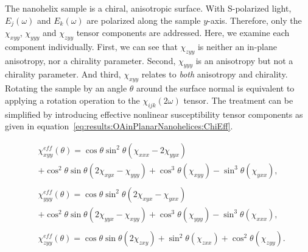 The nanohelix sample is a chiral, anisotropic surface. With S-polarized light, ${E_j}(\omega)$ and ${E_k}(\omega)$ are polarized along the sample $y$-axis. Therefore, only the $\chi_{xyy}$, $\chi_{yyy}$ and $\chi_{zyy}$ tensor components are addressed. Here, we examine each component individually. 
First, we can see that $\chi_{zyy}$ is neither an in-plane anisotropy, nor a chirality parameter. Second, $\chi_{yyy}$ is an anisotropy but not a chirality parameter. And third, $\chi_{xyy}$ relates to \textit{both} anisotropy and chirality. 
Rotating the sample by an angle $\theta$ around the surface normal is equivalent to applying a rotation operation to the $\chi_{ijk}(2\omega)$ tensor. The treatment can be simplified by introducing effective nonlinear susceptibility tensor components as given in equation~\ref{eq:results:OAinPlanarNanohelices:ChiEff}.

\begin{equation}\label{eq:results:OAinPlanarNanohelices:ChiEff}
	\begin{split}
		&\chi_{xyy}^{eff}(\theta) = \cos\theta\sin^2\theta(\chi_{xxx} - 2\chi_{yyx}) \\
		&+ {\cos^2}\theta\sin\theta (2\chi _{xyx} - \chi_{yyy}) + {\cos^3}\theta(\chi_{xyy}) - {\sin^3}\theta(\chi _{yxx}), \\
		\\
		&\chi_{yyy}^{eff}(\theta) = \cos\theta\sin^2\theta(2\chi_{xyx} - \chi_{yxx}) \\
		&+ {\cos^2}\theta\sin\theta (2\chi _{yyx} - \chi_{xyy}) + {\cos^3}\theta(\chi_{yyy}) - {\sin^3}\theta(\chi _{xxx}), \\
		\\
		&\chi _{zyy}^{eff}(\theta) = \cos\theta\sin\theta (2\chi_{zxy}) + {\sin^2}\theta(\chi_{zxx}) + {\cos^2}\theta (\chi_{zyy}).
	\end{split}
\end{equation}


